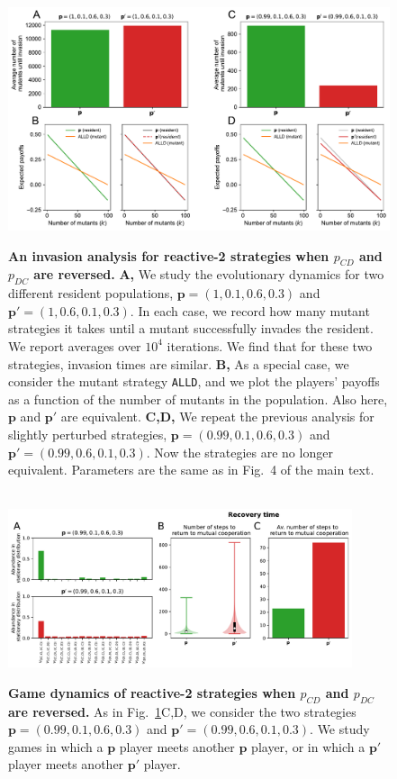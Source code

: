 \documentclass[9pt,twoside,lineno]{pnas-new}
\theoremstyle{plainCl1}
\theoremstyle{plainCl2}
\def\alld{\texttt{ALLD}}
\begin{document}
\begin{figure}[tbhp]
  \centering
  \includegraphics[width=.85\textwidth]{../../figures/siFigInvasionR2.pdf}
  \caption{\textbf{An invasion analysis for reactive-2 strategies when $p_{CD}$ and $p_{DC}$ are reversed.}
  \textbf{A,} We study the evolutionary dynamics for two different resident populations, $\mathbf{p}\!=\!(1,0.1,0.6,0.3)$ and $\mathbf{p'}\!=\!(1,0.6,0.1,0.3)$. 
  In each case, we record how many mutant strategies it takes until a mutant successfully invades the resident. 
  We report averages over $10^4$ iterations. We find that for these two strategies, invasion times are similar. 
  \textbf{B,} As a special case, we consider the mutant strategy \alld{}, and we plot the players' payoffs as a function of the number of mutants in the population. Also here, $\mathbf{p}$ and $\mathbf{p'}$ are equivalent. 
  \textbf{C,D,} We repeat the previous analysis for slightly perturbed strategies, $\mathbf{p}\!=\!(0.99,0.1,0.6,0.3)$ and $\mathbf{p'}\!=\!(0.99,0.6,0.1,0.3)$. Now the strategies are no longer equivalent. Parameters are the same as in Fig.~4 of the main text.
  }\label{fig:InvasionAnalysisReactive2}
  ~\\
  \includegraphics[width=0.9\textwidth]{../../figures/siFigReactiveTwoPayoffs.pdf}
  \caption{\textbf{Game dynamics of reactive-2 strategies when $p_{CD}$ and $p_{DC}$ are reversed.}
  As in Fig.~\ref{fig:InvasionAnalysisReactive2}C,D, we consider the two strategies $\mathbf{p}\!=\!(0.99,0.1,0.6,0.3)$ and $\mathbf{p'}\!=\!(0.99,0.6,0.1,0.3)$. We study games in which a $\mathbf{p}$ player meets another $\mathbf{p}$ player, or in which a $\mathbf{p'}$ player meets another $\mathbf{p'}$ player. 
}
\end{figure}
\end{document}

